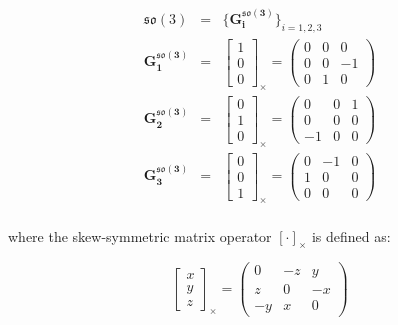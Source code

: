 \documentclass[a4paper,11pt]{report}
\begin{document}
\begin{eqnarray}
\mathfrak{so}(3) &=& \{  \mathbf{G^{\mathfrak{so}(3)}_i} \}_{i=1,2,3}  \\
\mathbf{G^{\mathfrak{so}(3)}_1} &=& \left[ \begin{array}{c} 1 \\ 0 \\0 \end{array} \right]_\times
= 
\left(
\begin{array}{ccc}
0 & 0 & 0  \\
0 & 0 & -1  \\
0 & 1 & 0  
\end{array}
\right)
\\
\mathbf{G^{\mathfrak{so}(3)}_2} &=& \left[ \begin{array}{c} 0 \\ 1 \\0 \end{array} \right]_\times 
= 
\left(
\begin{array}{ccc}
0 & 0 & 1  \\
0 & 0 & 0  \\
-1 & 0 & 0  
\end{array}
\right)
\\
\mathbf{G^{\mathfrak{so}(3)}_3} &=& \left[ \begin{array}{c} 0 \\ 0 \\1 \end{array} \right]_\times 
= 
\left(
\begin{array}{ccc}
0 & -1 & 0  \\
1 & 0 & 0  \\
0 & 0 & 0  
\end{array}
\right)
\\
\end{eqnarray}

\noindent where the skew-symmetric matrix operator $[\cdot]_\times$ is defined as:

\begin{equation}
\label{eq:skew}
\left[ \begin{array}{c} x \\ y \\z \end{array} \right]_\times
=
\left(
\begin{array}{ccc}
0 & -z & y  \\
z & 0 & -x  \\
-y & x & 0  
\end{array}
\right)
\end{equation}
\end{document}
